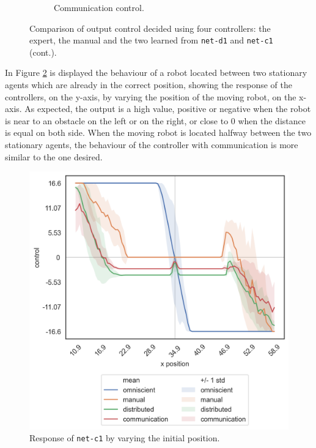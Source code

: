 \begin{figure}
\begin{center}
\begin{subfigure}[h]{0.35\textwidth}
			\caption{Communication control.}
		\end{subfigure}
	\end{center}
	\caption[]{Comparison of 
		output control decided using four controllers: the expert, the manual and the 
		two learned from \texttt{net-d1} and \texttt{net-c1} (cont.).}
	\label{fig:net-c1control}
\end{figure}

\bigskip 
In Figure \ref{fig:net-c1responseposition} is displayed the behaviour of a robot 
located between two stationary agents which are already in the correct position, 
showing the response of the controllers, on the y-axis, by varying the position of 
the moving robot, on the x-axis.  
As expected, the output is a high value, positive or negative when the robot is 
near to an obstacle on the left or on the right, or close to $0$ when the distance is 
equal on both side.
When the moving robot is located halfway between the two stationary agents, the 
behaviour of the controller with communication is more similar to the one desired.
\begin{figure}[!htb]
	\centering
	\includegraphics[width=.45\textwidth]{contents/images/net-c1/response-varying_init_position-communication}%
	\caption{Response of \texttt{net-c1} by varying the initial position.}
	\label{fig:net-c1responseposition}
\end{figure}


